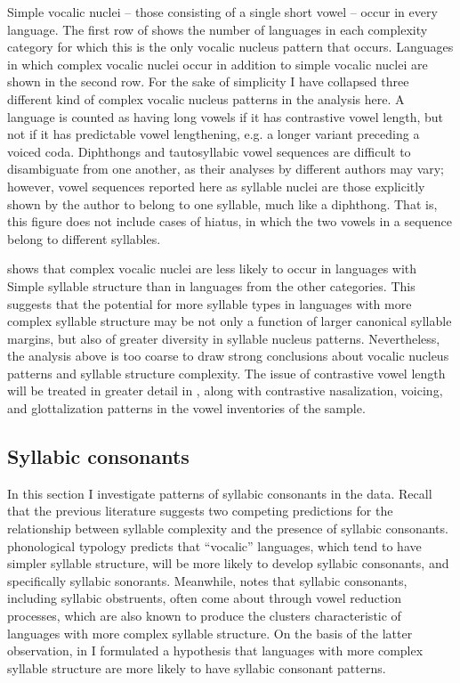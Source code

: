   Simple vocalic nuclei -- those consisting of a single short vowel -- occur in every language. The first row of  shows the number of languages in each complexity category for which this is the only vocalic nucleus pattern that occurs. Languages in which complex vocalic nuclei occur in addition to simple vocalic nuclei are shown in the second row. For the sake of simplicity I have collapsed three different kind of complex vocalic nucleus patterns in the analysis here. A language is counted as having long vowels if it has contrastive vowel length, but not if it has predictable vowel lengthening, e.g. a longer variant preceding a voiced coda. Diphthongs and tautosyllabic vowel sequences are difficult to disambiguate from one another, as their analyses by different authors may vary; however, vowel sequences reported here as syllable nuclei are those explicitly shown by the author to belong to one syllable, much like a diphthong. That is, this figure does not include cases of hiatus, in which the two vowels in a sequence belong to different syllables.

   shows that complex vocalic nuclei are less likely to occur in languages with Simple syllable structure than in languages from the other categories. This suggests that the potential for more syllable types in languages with more complex syllable structure may be not only a function of larger canonical syllable margins, but also of greater diversity in syllable nucleus patterns. Nevertheless, the analysis above is too coarse to draw strong conclusions about vocalic nucleus patterns and syllable structure complexity. The issue of contrastive vowel length will be treated in greater detail in , along with contrastive nasalization, voicing, and glottalization patterns in the vowel inventories of the sample.

\subsection{Syllabic consonants}\label{sec:3.3.5}

  In this section I investigate patterns of syllabic consonants in the data. Recall that the previous literature suggests two competing predictions for the relationship between syllable complexity and the presence of syllabic consonants.  phonological typology predicts that ``vocalic'' languages, which tend to have simpler syllable structure, will be more likely to develop syllabic consonants, and specifically syllabic sonorants. Meanwhile, \citet{Bell1978a} notes that syllabic consonants, including syllabic obstruents, often come about through vowel reduction processes, which are also known to produce the clusters characteristic of languages with more complex syllable structure. On the basis of the latter observation, in  I formulated a hypothesis that languages with more complex syllable structure are more likely to have syllabic consonant patterns.

